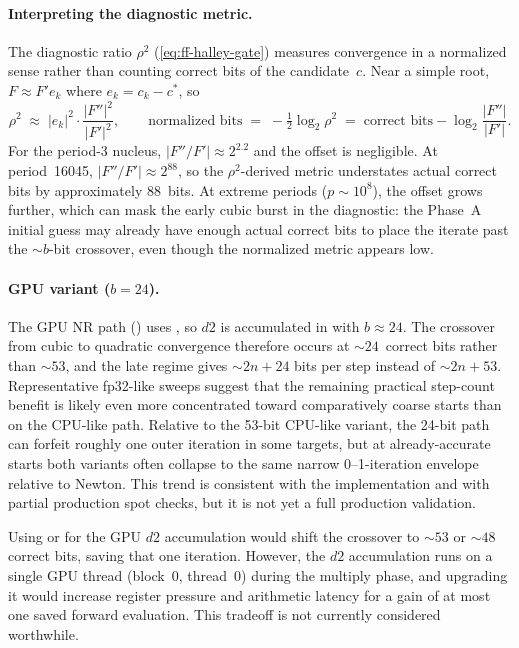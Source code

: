 \paragraph{Interpreting the diagnostic metric.}
The diagnostic ratio $\rho^2$ (\cref{eq:ff-halley-gate}) measures
convergence in a normalized sense rather than counting correct bits of
the candidate~$c$.  Near a simple root, $F \approx F' e_k$ where
$e_k = c_k - c^*$, so
\begin{equation}\label{eq:ff-rho2-offset}
\rho^2 \;\approx\; |e_k|^2 \cdot \frac{|F''|^2}{|F'|^2},
\qquad
  \text{normalized bits}
  \;=\; -\tfrac{1}{2}\log_2 \rho^2
  \;=\; \text{correct bits} - \log_2 \frac{|F''|}{|F'|}.
\end{equation}
For the period-3 nucleus, $|F''/F'| \approx 2^{2.2}$ and the offset is
negligible.  At period~16045, $|F''/F'| \approx 2^{88}$, so the
$\rho^2$-derived metric understates actual correct bits by approximately
88~bits.  At extreme periods ($p \sim 10^8$), the offset grows further,
which can mask the early cubic burst in the diagnostic: the Phase~A
initial guess may already have enough actual correct bits to place the
iterate past the ${\sim}b$-bit crossover, even though the normalized
metric appears low.

\paragraph{GPU variant ($b = 24$).}
The GPU NR path () uses ,
so $d2$ is accumulated in  with $b \approx 24$.
The crossover from cubic to quadratic convergence therefore occurs
at ${\sim}24$~correct bits rather than ${\sim}53$, and the late regime
gives ${\sim}2n + 24$ bits per step instead of ${\sim}2n + 53$.
Representative fp32-like sweeps suggest that the remaining practical
step-count benefit is likely even more concentrated toward comparatively coarse
starts than on the CPU-like path.  Relative to the 53-bit CPU-like variant,
the 24-bit path can forfeit roughly one outer iteration in some targets, but
at already-accurate starts both variants often collapse to the same narrow
0--1-iteration envelope relative to Newton.  This trend is consistent with the
implementation and with partial production spot checks, but it is not yet a
full production validation.

Using  or  for the GPU $d2$ accumulation
would shift the crossover to ${\sim}53$ or ${\sim}48$ correct bits,
saving that one iteration.
However, the $d2$ accumulation runs on a single GPU thread
(block~0, thread~0) during the multiply phase, and upgrading it would
increase register pressure and arithmetic latency for a gain of at most
one saved forward evaluation.  This tradeoff is not currently considered
worthwhile.

